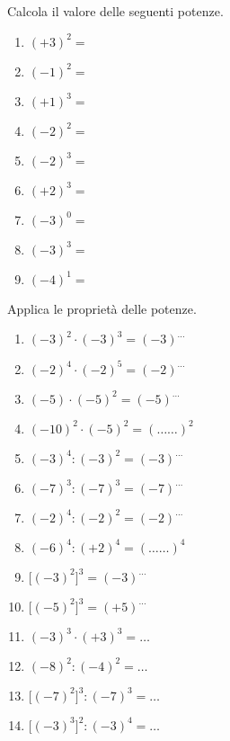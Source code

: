 \begin{esercizio}
\label{ese:2.22}
Calcola il valore delle seguenti potenze.

\vspace{-1em}
\begin{multicols}{3}
 \begin{enumerate}[noitemsep, label=(\alph*)]
 \item \((+3)^2 =\)
 \item \((-1)^2 =\)
 \item \((+1)^3 =\)
 \item \((-2)^2 =\)
 \item \((-2)^3 =\)
 \item \((+2)^3 =\)
 \item \((-3)^0 =\)
 \item \((-3)^3 =\)
 \item \((-4)^1 =\)
 \end{enumerate}
 \end{multicols}
\end{esercizio}

\begin{esercizio}
\label{ese:2.23}
 Applica le proprietà delle potenze.
 
\vspace{-1em}
\begin{multicols}{2}
 \begin{enumerate}[noitemsep, label=(\alph*)]
 \item \((-3)^2\cdot(-3)^3 = (-3)^{\ldots}\)
 \item \((-2)^4\cdot(-2)^5 = (-2)^{\ldots}\)
 \item \((-5)\cdot(-5)^2 = (-5)^{\ldots}\)
 \item \((-10)^2\cdot(-5)^2 = (\ldots \ldots)^2\)
 \item \((-3)^4:(-3)^2 = (-3)^{\ldots}\)
 \item \((-7)^3:(-7)^3=(-7)^{\ldots}\)
 \item \((-2)^4:(-2)^2=(-2)^{\ldots}\)
 \item \((-6)^4:(+2)^4=(\ldots \ldots)^4\)
 \item \(\big[(-3)^2\big]^3 = (-3)^{\ldots}\)
 \item \(\big[(-5)^2\big]^3=(+5)^{\ldots}\)
 \item \((-3)^3\cdot(+3)^3 = \ldots\)
 \item \((-8)^2:(-4)^2= \ldots\)
 \item \(\big[(-7)^2\big]^3: (-7)^3 =\ldots\)
 \item \(\big[(-3)^3\big]^2: (-3)^4=\ldots\)
 \end{enumerate}
 \end{multicols}
\end{esercizio}


